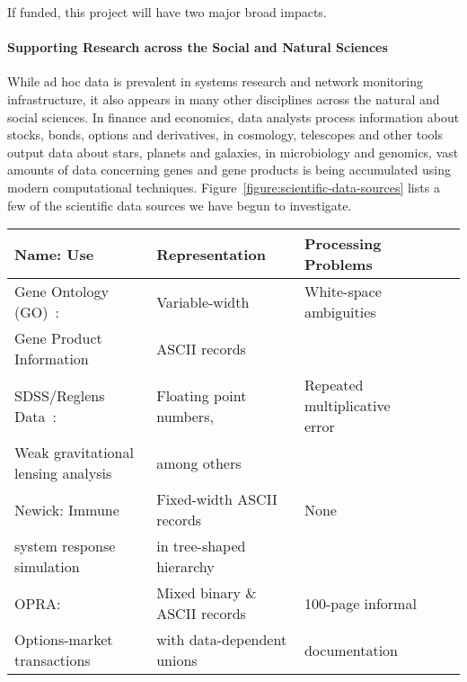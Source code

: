 \documentclass[10pt]{article}
\begin{document}
If funded, this project will have two major broad impacts.

\paragraph*{Supporting Research across the Social and Natural Sciences}
While ad hoc data is prevalent in systems research and network monitoring
infrastructure, it also appears in many other disciplines
across the natural and social sciences. In finance and economics,
data analysts process information about stocks, bonds, options and derivatives,
in cosmology, telescopes and other tools output data about stars, planets and
galaxies, in microbiology and genomics, vast amounts of data concerning
genes and gene products is being accumulated using modern computational techniques.
Figure~\ref{figure:scientific-data-sources} lists a few of the scientific data sources
we have begun to investigate.

\begin{figure*}
\begin{center}
\begin{tabular}{@{}|l|l|l|l|l|}
\hline
Name: Use                           & Representation    & Processing Problems \\ \hline\hline
Gene Ontology (GO)~\cite{geneontology}:                  & Variable-width    & White-space ambiguities \\
Gene Product Information 	      & ASCII records &  \\ \hline
SDSS/Reglens Data~\cite{mandelbaum+:reglens}:                & Floating point numbers, & Repeated multiplicative error \\
Weak gravitational lensing analysis   & among others & \\ \hline
Newick:   Immune                    & Fixed-width ASCII records & None \\ 
system response simulation          & in tree-shaped hierarchy &\\ \hline                                
OPRA:                               & Mixed binary \& ASCII records 
                                                       & 100-page informal \\
Options-market transactions         & with data-dependent unions & documentation \\ \hline
\end{tabular}
\caption{Selected ad hoc scientific data sources.}
\label{figure:scientific-data-sources}
\end{center}
\end{figure*}
\end{document}
